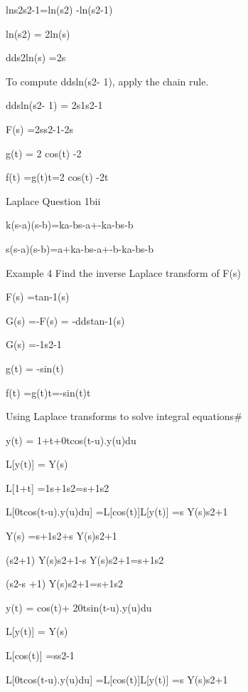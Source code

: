  lns2s2-1=ln(s2) -ln(s2-1)


ln(s2) = 2ln(s)



dds2ln(s) =2s



To compute  ddsln(s2- 1), apply the chain rule.



ddsln(s2- 1) = 2s1s2-1 


 F(s) =2ss2-1-2s



 g(t) = 2 cos(t) -2


f(t) =g(t)t=2 cos(t) -2t


Laplace Question 1bii

 

 

k(s-a)(s-b)=ka-bs-a+-ka-bs-b

 

 

s(s-a)(s-b)=a+ka-bs-a+-b-ka-bs-b



 

Example 4                  Find the inverse Laplace transform of  F(s)


F(s) =tan-1(s)


G(s) =-F(s) = -ddstan-1(s)


G(s) =-1s2-1


g(t) = -sin(t)


f(t) =g(t)t=-sin(t)t

 

 

Using Laplace transforms to solve integral equations#

 

 y(t) = 1+t+0tcos(t-u).y(u)du

 

L[y(t)] = Y(s)

 

L[1+t] =1s+1s2=s+1s2

 

L[0tcos(t-u).y(u)du] =L[cos(t)]L[y(t)] =s Y(s)s2+1

 

Y(s) =s+1s2+s Y(s)s2+1

 

(s2+1) Y(s)s2+1-s Y(s)s2+1=s+1s2

 

(s2-s +1) Y(s)s2+1=s+1s2

 

 


 y(t) = cos(t)+ 20tsin(t-u).y(u)du


 

 

L[y(t)] = Y(s)

 

L[cos(t)] =ss2-1

 

L[0tcos(t-u).y(u)du] =L[cos(t)]L[y(t)] =s Y(s)s2+1


